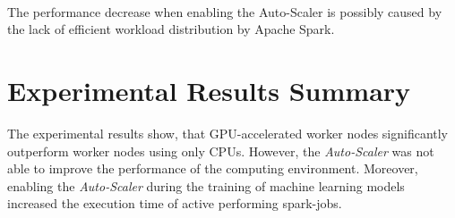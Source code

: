 \paragraph{}
The performance decrease when enabling the Auto-Scaler is possibly caused by the lack of efficient workload distribution by Apache Spark.


\section{Experimental Results Summary}
The experimental results show, that GPU-accelerated worker nodes significantly outperform worker nodes using only CPUs.
However, the \textit{Auto-Scaler} was not able to improve the performance of the computing environment.
%
Moreover, enabling the \textit{Auto-Scaler} during the training of machine learning models increased the execution time of active performing spark-jobs.

